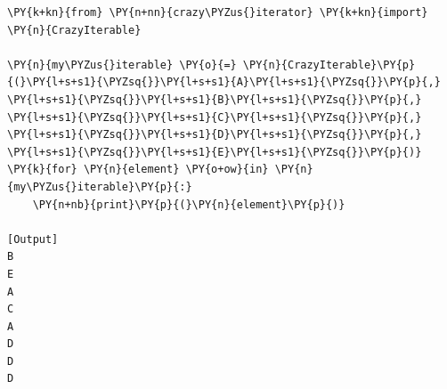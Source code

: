 \begin{Verbatim}[label=\makebox{\url{https://github.com/lucabaldini/cmepda/tree/master/slides/latex/snippets/test\_crazy\_iterator.py}},commandchars=\\\{\}]
\PY{k+kn}{from} \PY{n+nn}{crazy\PYZus{}iterator} \PY{k+kn}{import} \PY{n}{CrazyIterable}
   
\PY{n}{my\PYZus{}iterable} \PY{o}{=} \PY{n}{CrazyIterable}\PY{p}{(}\PY{l+s+s1}{\PYZsq{}}\PY{l+s+s1}{A}\PY{l+s+s1}{\PYZsq{}}\PY{p}{,} \PY{l+s+s1}{\PYZsq{}}\PY{l+s+s1}{B}\PY{l+s+s1}{\PYZsq{}}\PY{p}{,} \PY{l+s+s1}{\PYZsq{}}\PY{l+s+s1}{C}\PY{l+s+s1}{\PYZsq{}}\PY{p}{,} \PY{l+s+s1}{\PYZsq{}}\PY{l+s+s1}{D}\PY{l+s+s1}{\PYZsq{}}\PY{p}{,} \PY{l+s+s1}{\PYZsq{}}\PY{l+s+s1}{E}\PY{l+s+s1}{\PYZsq{}}\PY{p}{)}
\PY{k}{for} \PY{n}{element} \PY{o+ow}{in} \PY{n}{my\PYZus{}iterable}\PY{p}{:}
    \PY{n+nb}{print}\PY{p}{(}\PY{n}{element}\PY{p}{)}

[Output]
B
E
A
C
A
D
D
D
\end{Verbatim}